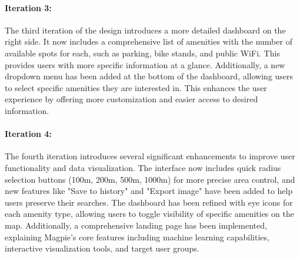 \paragraph{Iteration 3:}
The third iteration of the design introduces a more detailed dashboard on the right side. It now includes a comprehensive list of amenities with the number of available spots for each, such as parking, bike stands, and public WiFi. This provides users with more specific information at a glance.
Additionally, a new dropdown menu has been added at the bottom of the dashboard, allowing users to select specific amenities they are interested in. This enhances the user experience by offering more customization and easier access to desired information.

\paragraph{Iteration 4:}
The fourth iteration introduces several significant enhancements to improve user functionality and data visualization. The interface now includes quick radius selection buttons (100m, 200m, 500m, 1000m) for more precise area control, and new features like "Save to history" and "Export image" have been added to help users preserve their searches. The dashboard has been refined with eye icons for each amenity type, allowing users to toggle visibility of specific amenities on the map. Additionally, a comprehensive landing page has been implemented, explaining Magpie's core features including machine learning capabilities, interactive visualization tools, and target user groups.

